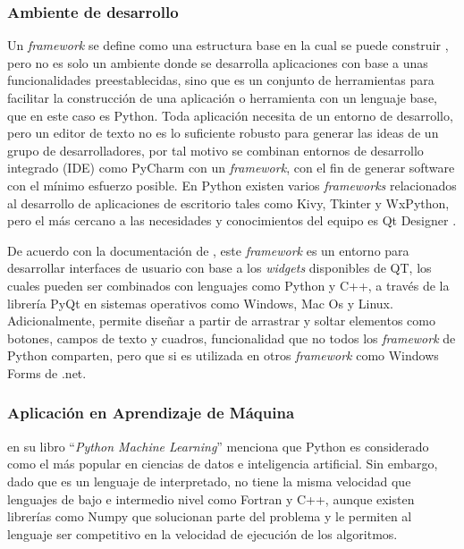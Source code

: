 \subsubsection{Ambiente de desarrollo}
Un \textit{framework} se define como una estructura base en la cual se puede construir \parencite{CambridgeDefFramework}, pero no es solo un ambiente donde se desarrolla aplicaciones con base a unas funcionalidades preestablecidas, sino que es un conjunto de herramientas para facilitar la construcción de una aplicación o herramienta con un lenguaje base, que en este caso es Python. Toda aplicación necesita de un entorno de desarrollo, pero un editor de texto no es lo suficiente robusto para generar las ideas de un grupo de desarrolladores, por tal motivo se combinan entornos de desarrollo integrado (IDE) como PyCharm con un \textit{framework}, con el fin de generar software con el mínimo esfuerzo posible. En Python existen varios \textit{frameworks} relacionados al desarrollo de aplicaciones de escritorio tales como Kivy, Tkinter y WxPython, pero el más cercano a las necesidades y conocimientos del equipo es Qt Designer \parencite{QTDes}. 

De acuerdo con la documentación de \textcite{QTDesDoc}, este \textit{framework} es un entorno para desarrollar interfaces de usuario con base a los \textit{widgets} disponibles de QT, los cuales pueden ser combinados con lenguajes como Python y C++, a través de la librería PyQt en sistemas operativos como Windows, Mac Os y Linux. Adicionalmente, permite diseñar a partir de arrastrar y soltar elementos como botones, campos de texto y cuadros, funcionalidad que no todos los \textit{framework} de Python comparten, pero que si es utilizada en otros \textit{framework} como Windows Forms de .net.

\subsubsection{Aplicación en Aprendizaje de Máquina}
\textcite{raschka2015python} en su libro ``\textit{Python Machine Learning}'' menciona que Python es considerado como el más popular en ciencias de datos e inteligencia artificial. Sin embargo, dado que es un lenguaje de interpretado, no tiene la misma velocidad que lenguajes de bajo e intermedio nivel como Fortran y C++, aunque existen librerías como Numpy que solucionan parte del problema y le permiten al lenguaje ser competitivo en la velocidad de ejecución de los algoritmos.

